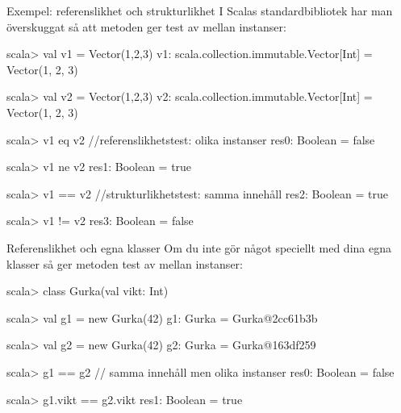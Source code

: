 \begin{Slide}{Exempel: referenslikhet och strukturlikhet}
I Scalas standardbibliotek har man överskuggat  så att metoden \code{==} ger test av  mellan instanser:
\begin{REPL}
scala> val v1 = Vector(1,2,3)
v1: scala.collection.immutable.Vector[Int] = Vector(1, 2, 3)

scala> val v2 = Vector(1,2,3)
v2: scala.collection.immutable.Vector[Int] = Vector(1, 2, 3)

scala> v1 eq v2                //referenslikhetstest: olika instanser
res0: Boolean = false

scala> v1 ne v2
res1: Boolean = true

scala> v1 == v2                //strukturlikhetstest: samma innehåll
res2: Boolean = true

scala> v1 != v2
res3: Boolean = false
\end{REPL}
\end{Slide}


\begin{Slide}{Referenslikhet och egna klasser}
Om du inte gör något speciellt med dina egna klasser så ger metoden \code{==} test av  mellan instanser:
\begin{REPLnonum}
scala> class Gurka(val vikt: Int)

scala> val g1 = new Gurka(42)
g1: Gurka = Gurka@2cc61b3b

scala> val g2 = new Gurka(42)
g2: Gurka = Gurka@163df259

scala> g1 == g2       // samma innehåll men olika instanser
res0: Boolean = false

scala> g1.vikt == g2.vikt
res1: Boolean = true
\end{REPLnonum}
\end{Slide}

\ifkompendium\else
\fi
